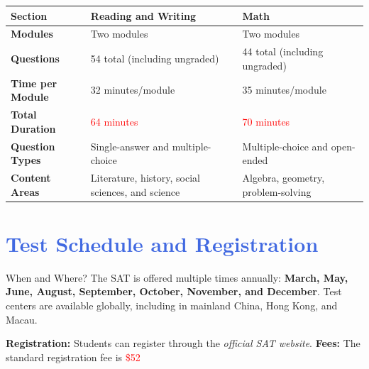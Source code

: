 \documentclass{article}
\begin{document}
\begin{tcolorbox}[colback=Lavender!6, colframe=RoyalBlue, coltitle=white,
title=\textbf{SAT Test Components}, sharp corners=all, width=168mm, boxrule=0.8mm]

\begin{center}
\begin{tabular}{|p{4cm}|p{5cm}|p{5cm}|}
\hline
 \textbf{Section} & \textbf{Reading and Writing} & \textbf{Math} \\ \hline
\textbf{Modules} & Two modules & Two modules \\ \hline
\textbf{Questions} & 54 total (including ungraded) & 44 total (including ungraded) \\ \hline
\textbf{Time per Module} & 32 minutes/module & 35 minutes/module \\ \hline
\textbf{Total Duration} & \textcolor{Red}{64 minutes} & \textcolor{Red}{70 minutes} \\ \hline
\textbf{Question Types} & Single-answer and multiple-choice & Multiple-choice and open-ended \\ \hline
\textbf{Content Areas} & Literature, history, social sciences, and science & Algebra, geometry, problem-solving \\ \hline
\end{tabular}
\end{center}

\end{tcolorbox}



\vspace{0.8cm}

\section*{\textcolor{RoyalBlue}{Test Schedule and Registration}}
\begin{definitionbox}{When and Where?}
The SAT is offered multiple times annually: \textbf{March, May, June, August, September, October, November, and December}. Test centers are available globally, including in mainland China, Hong Kong, and Macau.
\end{definitionbox}

\textbf{Registration:} Students can register through the \textit{official SAT website}.  
\textbf{Fees:} The standard registration fee is \textcolor{Red}{\$52}
\vspace{0.8cm}
\end{document}

